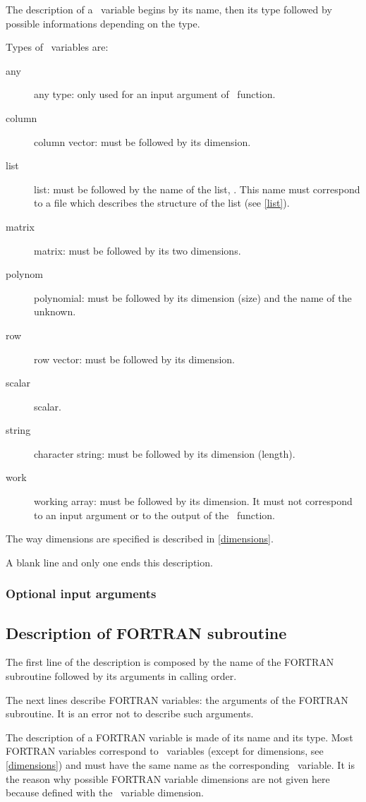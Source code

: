 The description of a \SCI\ variable begins by its name, then its type followed
by possible informations depending on the type.

Types of \SCI\ variables are:
\begin{description}
  \item[any] any type: only used for an input argument of \SCI\ function.
  \item[column] column vector: must be followed by its dimension.
  \item[list] list: must be followed by the name of the list,
. This name must correspond to a file 
which describes the structure of the list (see \ref{list}).
  \item[matrix] matrix: must be followed by its two dimensions.
  \item[polynom] polynomial: must be followed by its dimension (size) and the
name of the unknown.
  \item[row] row vector: must be followed by its dimension.
  \item[scalar] scalar.
  \item[string] character string: must be followed by its dimension (length).
  \item[work] working array: must be followed by its dimension. It must not
correspond to an input argument or to the output of the \SCI\ function.
\end{description}

The way dimensions are specified is described in 
\ref{dimensions}.
\smallskip

A blank line and only one ends this description.

\subsubsection{Optional input arguments}

\subsection{Description of FORTRAN subroutine}
\label{fortran}

The first line of the description is composed by the name of the 
FORTRAN subroutine
followed by its arguments in calling order.

The next lines describe FORTRAN variables: the arguments of the FORTRAN
subroutine. 
It is an error not to describe such arguments.

The description of a FORTRAN variable is made of its name and its type.
Most FORTRAN variables correspond to \SCI\ variables (except for
dimensions, see \ref{dimensions}) and must have the same name as the
corresponding \SCI\ variable. It is the reason why possible FORTRAN variable
dimensions are not given here because defined with the \SCI\ variable
dimension.

